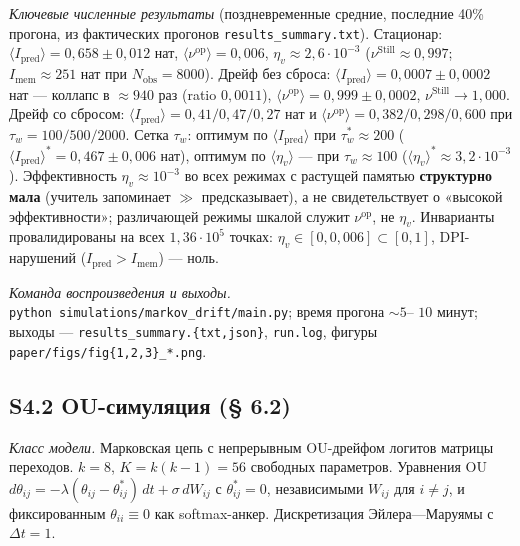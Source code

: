 \documentclass[pdflatex,sn-mathphys-ay]{sn-jnl}
\begin{document}
\emph{Ключевые численные результаты} (поздневременные средние, последние 40\% прогона, из фактических прогонов \texttt{results\_summary.txt}). Стационар: \(\langle I_{\text{pred}}\rangle = 0{,}658 \pm 0{,}012\) нат, \(\langle\nu^{\text{op}}\rangle = 0{,}006\), \(\eta_v \approx 2{,}6 \cdot 10^{-3}\) (\(\nu^{\text{Still}} \approx 0{,}997\); \(I_{\text{mem}} \approx 251\) нат при \(N_{\text{obs}} = 8000\)). Дрейф без сброса: \(\langle I_{\text{pred}}\rangle = 0{,}0007 \pm 0{,}0002\) нат --- коллапс в \(\approx 940\) раз (ratio \(0{,}0011\)), \(\langle\nu^{\text{op}}\rangle = 0{,}999 \pm 0{,}0002\), \(\nu^{\text{Still}} \to 1{,}000\). Дрейф со сбросом: \(\langle I_{\text{pred}}\rangle = 0{,}41 / 0{,}47 / 0{,}27\) нат и \(\langle\nu^{\text{op}}\rangle = 0{,}382 / 0{,}298 / 0{,}600\) при \(\tau_w = 100 / 500 / 2000\). Сетка \(\tau_w\): оптимум по \(\langle I_{\text{pred}}\rangle\) при \(\tau_w^* \approx 200\) (\(\langle I_{\text{pred}}\rangle^* = 0{,}467 \pm 0{,}006\) нат), оптимум по \(\langle\eta_v\rangle\) --- при \(\tau_w \approx 100\) (\(\langle\eta_v\rangle^* \approx 3{,}2 \cdot 10^{-3}\)). Эффективность \(\eta_v \approx 10^{-3}\) во всех режимах с растущей памятью \textbf{структурно мала} (учитель запоминает \(\gg\) предсказывает), а не свидетельствует о «высокой эффективности»; различающей режимы шкалой служит \(\nu^{\text{op}}\), не \(\eta_v\). Инварианты провалидированы на всех \(1{,}36 \cdot 10^5\) точках: \(\eta_v \in [0, 0{,}006] \subset [0,1]\), DPI-нарушений (\(I_{\text{pred}} > I_{\text{mem}}\)) --- ноль.



\emph{Команда воспроизведения и выходы.} \texttt{python\ simulations/markov\_drift/main.py}; время прогона \(\sim 5\)-- \(10\) минут; выходы --- \texttt{results\_summary.\{txt,json\}}, \texttt{run.log}, фигуры \texttt{paper/figs/fig\{1,2,3\}\_*.png}.



\subsection*{S4.2 OU-симуляция (§ 6.2)}\label{s4.2-ou-ux441ux438ux43cux443ux43bux44fux446ux438ux44f-6.2}



\emph{Класс модели.} Марковская цепь с непрерывным OU-дрейфом логитов матрицы переходов. \(k = 8\), \(K = k(k-1) = 56\) свободных параметров. Уравнения OU \(d\theta_{ij} = -\lambda(\theta_{ij} - \theta_{ij}^*)\, dt + \sigma\, dW_{ij}\) с \(\theta_{ij}^* = 0\), независимыми \(W_{ij}\) для \(i \ne j\), и фиксированным \(\theta_{ii} \equiv 0\) как softmax-анкер. Дискретизация Эйлера---Маруямы с \(\Delta t = 1\).
\end{document}

